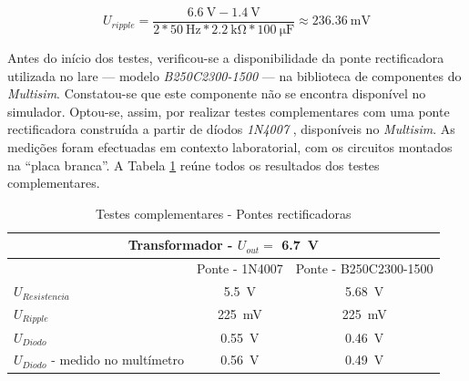 \begin{equation} \label{eq:vrippleOCTeorico}
	U_{ripple} = \frac{\SI{6.6}{\volt} - \SI{1.4}{\volt}}{2*\SI{50}{\hertz}*\SI{2.2}{\kilo\ohm}*\SI{100}{\micro\farad}} \approx \SI{236.36}{\milli\volt}
\end{equation}

Antes do início dos testes, verificou-se a disponibilidade da ponte rectificadora utilizada no \acrshort{lare} — modelo \textit{B250C2300-1500} — na biblioteca de componentes do \textit{Multisim}. Constatou-se que este componente não se encontra disponível no simulador. Optou-se, assim, por realizar testes complementares com uma ponte rectificadora construída a partir de díodos \textit{1N4007} \cite{1N400x}, disponíveis no \textit{Multisim}. As medições foram efectuadas em contexto laboratorial, com os circuitos montados na ``placa branca''. A Tabela \ref{Table:testespontes} reúne todos os resultados dos testes complementares.

\begin{table}[htb]
\centering
\caption{Testes complementares - Pontes rectificadoras} 
\label{Table:testespontes}
\begin{tabular}{lcc}
\toprule
\multicolumn{3}{c}{Transformador - $U_{out} = $ \SI{6.7}{\volt}} \\
\midrule
 & Ponte - 1N4007 & Ponte - B250C2300-1500 \\
\midrule
$U_{Resistencia}$ & \SI{5.5}{\volt} & \SI{5.68}{\volt} \\
\midrule
$U_{Ripple}$ & \SI{225}{\milli\volt} & \SI{225}{\milli\volt} \\
\midrule
$U_{Diodo}$ & \SI{0.55}{\volt} & \SI{0.46}{\volt} \\
\midrule
$U_{Diodo}$ - medido no multímetro & \SI{0.56}{\volt} & \SI{0.49}{\volt} \\
\bottomrule
\end{tabular}
\end{table}


